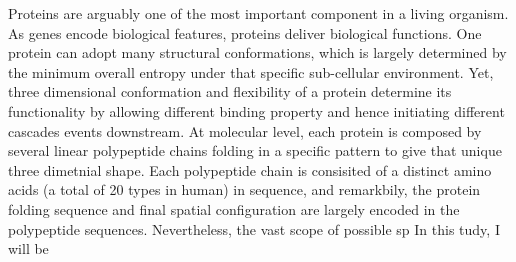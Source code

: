 Proteins are arguably one of the most important component in a living organism. As genes encode biological features, proteins deliver biological functions. One protein can adopt many structural conformations, which is largely determined by the minimum overall entropy under that specific sub-cellular environment. Yet, three dimensional conformation and flexibility of a protein determine its functionality by allowing different binding property and hence initiating different cascades events downstream. At molecular level, each protein is composed by several linear polypeptide chains folding in a specific pattern to give that unique three dimetnial shape. Each polypeptide chain is consisited of a distinct amino acids (a total of 20 types in human) in sequence, and remarkbily, the protein folding sequence and final spatial configuration are largely encoded in the polypeptide sequences. Nevertheless, the vast scope of possible sp In this tudy, I will be 